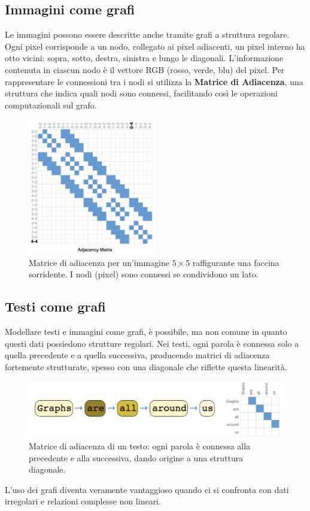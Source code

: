 \subsection{Immagini come grafi}

Le immagini possono essere descritte anche tramite grafi a struttura regolare. Ogni pixel corrisponde a un nodo, collegato ai pixel adiacenti, un pixel interno ha otto vicini: sopra, sotto, destra, sinistra e lungo le diagonali. L'informazione contenuta in ciascun nodo è il vettore RGB (rosso, verde, blu) del pixel. Per rappresentare le connessioni tra i nodi si utilizza la \textbf{Matrice di Adiacenza}, una struttura che indica quali nodi sono connessi, facilitando così le operazioni computazionali sul grafo.

\begin{figure}
    \centering
    \includegraphics[width=0.5\textwidth]{figure/AdjacencyMatrix}
    \caption{Matrice di adiacenza per un'immagine $5\times5$ raffigurante una faccina sorridente. I nodi (pixel) sono connessi se condividono un lato.}
    \label{fig:adjMatrix}
\end{figure}

\subsection{Testi come grafi}

Modellare testi e immagini come grafi, è possibile, ma non comune in quanto questi dati possiedono strutture regolari. Nei testi, ogni parola è connessa solo a quella precedente e a quella successiva, producendo matrici di adiacenza fortemente strutturate, spesso con una diagonale che riflette questa linearità.
\begin{figure}
    \centering
    \includegraphics[width=\textwidth]{figure/TextGraph.png}
    \caption{Matrice di adiacenza di un testo: ogni parola è connessa alla precedente e alla successiva, dando origine a una struttura diagonale.}
    \label{fig:textGraph}
\end{figure}
L’uso dei grafi diventa veramente vantaggioso quando ci si confronta con dati irregolari e relazioni complesse non lineari.

